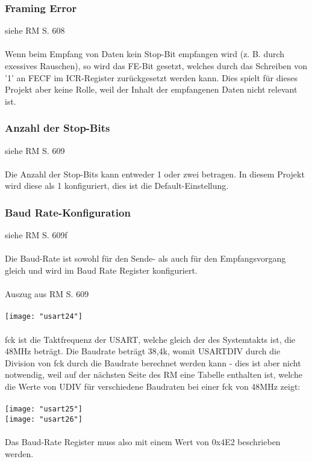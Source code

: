 \documentclass[11pt]{report}
\begin{document}
			\subsubsection{Framing Error}
				siehe RM S. 608\\
				\\Wenn beim Empfang von Daten kein Stop-Bit empfangen wird (z. B. durch exessives Rauschen), so wird das FE-Bit gesetzt, welches durch das Schreiben von '1' an FECF im ICR-Register zurückgesetzt werden kann. Dies spielt für dieses Projekt aber keine Rolle, weil der Inhalt der empfangenen Daten nicht relevant ist.
			\subsubsection{Anzahl der Stop-Bits}
				siehe RM S. 609\\
				\\Die Anzahl der Stop-Bits kann entweder 1 oder zwei betragen. In diesem Projekt wird diese als 1 konfiguriert, dies ist die Default-Einstellung.
			\subsubsection{Baud Rate-Konfiguration}
				siehe RM S. 609f\\
				\\Die Baud-Rate ist sowohl für den Sende- als auch für den Empfangsvorgang gleich und wird im Baud Rate Register konfiguriert.\\
				\\Auszug aus RM S. 609\\
				\\\texttt{[image: "usart24"]}\\
				\\fck ist die Taktfrequenz der USART, welche gleich der des Systemtakts ist, die 48MHz beträgt. Die Baudrate beträgt 38,4k, womit USARTDIV durch die Division von fck durch die Baudrate berechnet werden kann - dies ist aber nicht notwendig, weil auf der nächsten Seite des RM eine Tabelle enthalten ist, welche die Werte von UDIV für verschiedene Baudraten bei einer fck von 48MHz zeigt:\\
				\\\texttt{[image: "usart25"]}\\
				\texttt{[image: "usart26"]}\\
				\\Das Baud-Rate Register muss also mit einem Wert von 0x4E2 beschrieben werden.
\end{document}
